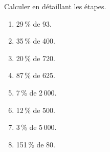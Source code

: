 \begin{exercice*}
   Calculer en détaillant les étapes.
   \begin{multicols}{2}
   \begin{enumerate}
      \item 29\,\% de 93.
      \item 35\,\% de 400.
      \item 20\,\% de 720.
      \item 87\,\% de 625.
      \columnbreak
      \item 7\,\% de 2\,000.
      \item 12\,\% de 500.
      \item 3\,\% de 5\,000.
      \item 151\,\% de 80.
   \end{enumerate}
   \end{multicols}
\end{exercice*}
   